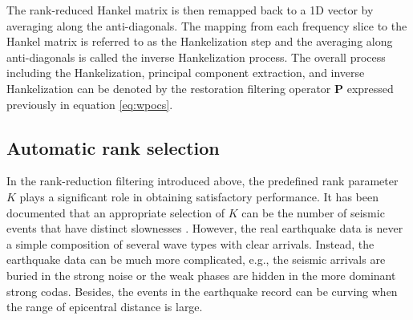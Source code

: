 The rank-reduced Hankel matrix is then remapped back to a 1D vector by averaging along the anti-diagonals. The mapping from each frequency slice to the Hankel matrix is referred to as the Hankelization step and the averaging along anti-diagonals is called the inverse Hankelization process. The overall process including the Hankelization, principal component extraction, and inverse Hankelization can be denoted by the restoration filtering operator $\mathbf{P}$ expressed previously in equation \ref{eq:wpocs}. 

\subsection*{Automatic rank selection} In the rank-reduction filtering introduced above, the predefined rank parameter $K$ plays a significant role in obtaining satisfactory performance. It has been documented that an appropriate selection of $K$ can be the number of seismic events that have distinct slownesses \cite[]{mssa}. However, the real earthquake data is never a simple composition of several wave types with clear arrivals. Instead, the earthquake data can be much more complicated, e.g., the seismic arrivals are buried  in the strong noise or the weak phases are hidden in the more dominant strong codas. Besides, the events in the earthquake record can be curving when the range of epicentral distance is large. 


